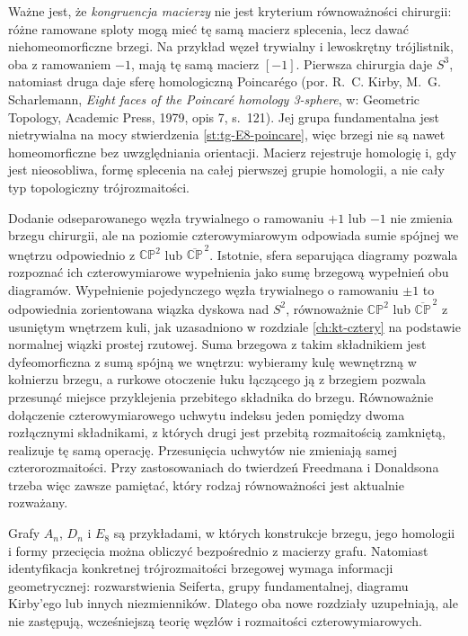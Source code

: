 Ważne jest, że \emph{kongruencja macierzy}
nie jest kryterium równoważności chirurgii:
różne ramowane sploty mogą mieć tę samą macierz
splecenia, lecz dawać niehomeomorficzne brzegi. Na przykład
węzeł trywialny i lewoskrętny trójlistnik, oba
z ramowaniem $-1$, mają tę samą macierz $[-1]$.
Pierwsza chirurgia daje $S^3$, natomiast druga
daje sferę homologiczną Poincarégo
(por. R.~C. Kirby, M.~G. Scharlemann,
\emph{Eight faces of the Poincaré homology 3-sphere},
w: Geometric Topology, Academic Press, 1979,
opis 7, s.~121). Jej grupa fundamentalna
jest nietrywialna na mocy stwierdzenia
\ref{st:tg-E8-poincare}, więc brzegi nie są
nawet homeomorficzne bez uwzględniania orientacji.
Macierz rejestruje homologię i, gdy jest
nieosobliwa, formę splecenia na całej pierwszej
grupie homologii, a nie cały typ topologiczny
trójrozmaitości.

\begin{uwaga}
Dodanie odseparowanego węzła trywialnego o ramowaniu
$+1$ lub $-1$ nie zmienia brzegu chirurgii,
ale na poziomie czterowymiarowym odpowiada
sumie spójnej we wnętrzu odpowiednio z
$\mathbb{CP}^2$ lub $\overline{\mathbb{CP}}^{\,2}$.
Istotnie, sfera separująca diagramy pozwala
rozpoznać ich czterowymiarowe wypełnienia jako
sumę brzegową wypełnień obu diagramów.
Wypełnienie pojedynczego węzła trywialnego
o ramowaniu $\pm1$ to odpowiednia zorientowana
wiązka dyskowa nad $S^2$, równoważnie
$\mathbb{CP}^2$ lub $\overline{\mathbb{CP}}^{\,2}$
z usuniętym wnętrzem kuli, jak uzasadniono w rozdziale
\ref{ch:kt-cztery} na podstawie normalnej wiązki
prostej rzutowej. Suma brzegowa z takim składnikiem
jest dyfeomorficzna z sumą spójną we wnętrzu:
wybieramy kulę wewnętrzną w kołnierzu brzegu,
a rurkowe otoczenie łuku łączącego ją z brzegiem
pozwala przesunąć miejsce przyklejenia przebitego
składnika do brzegu. Równoważnie dołączenie
czterowymiarowego uchwytu indeksu jeden pomiędzy
dwoma rozłącznymi składnikami, z których drugi
jest przebitą rozmaitością zamkniętą, realizuje
tę samą operację.
Przesunięcia uchwytów nie zmieniają samej
czterorozmaitości. Przy zastosowaniach do twierdzeń
Freedmana i Donaldsona trzeba więc zawsze pamiętać,
który rodzaj równoważności jest aktualnie rozważany.
\end{uwaga}

\begin{uwaga}
Grafy $A_n$, $D_n$ i $E_8$ są przykładami, w których
konstrukcje brzegu, jego homologii i formy przecięcia
można obliczyć bezpośrednio z macierzy grafu. Natomiast
identyfikacja konkretnej trójrozmaitości brzegowej
wymaga informacji geometrycznej: rozwarstwienia
Seiferta, grupy fundamentalnej, diagramu Kirby'ego
lub innych niezmienników. Dlatego oba nowe rozdziały
uzupełniają, ale nie zastępują, wcześniejszą teorię
węzłów i rozmaitości czterowymiarowych.
\end{uwaga}
